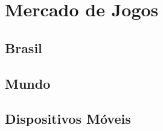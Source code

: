 
\chapter{Mercado de Jogos}
\label{cap:mercadoJogos}


\section{Brasil}
%
%
%
%
%
%
%
%
%
%
%
%
%
%
%
%








\section{Mundo}



\section{Dispositivos Móveis}
